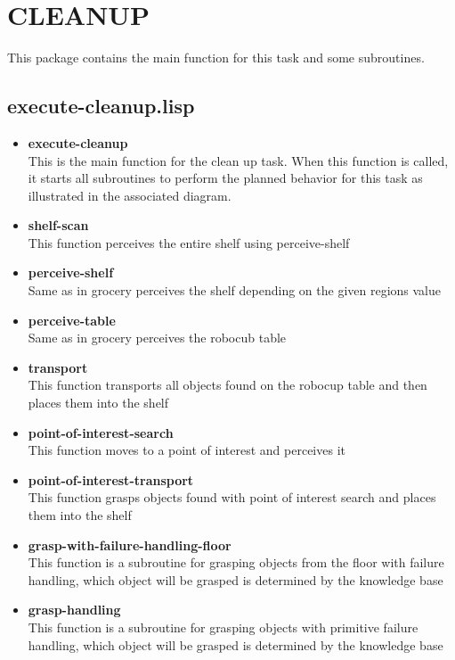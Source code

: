 \documentclass[main.tex]{subfiles}
\begin{document}
	  	\section{CLEANUP}
	  	This package contains the main function for this task and some subroutines.
	  	\subsection{execute-cleanup.lisp}
	  	\begin{itemize}
			\item \textbf{execute-cleanup} \\
			This is the main function for the clean up task. When this function is called, it starts all subroutines to perform the planned behavior for this task as illustrated in the associated diagram.
			\item \textbf{shelf-scan} \\
			This function perceives the entire shelf using perceive-shelf
			\item \textbf{perceive-shelf} \\
			Same as in grocery perceives the shelf depending on the given regions value
			\item \textbf{perceive-table} \\
			Same as in grocery perceives the robocub table
			\item \textbf{transport} \\
            This function transports all objects found on the robocup table and then places them into the shelf
			\item \textbf{point-of-interest-search} \\
			This function moves to a point of interest and perceives it 
			\item \textbf{point-of-interest-transport} \\
			This function grasps objects found with point of interest search and places them into the shelf
			\item \textbf{grasp-with-failure-handling-floor} \\
			This function is a subroutine for grasping objects from the floor with failure handling, which object will be grasped is determined by the knowledge base
			\item \textbf{grasp-handling}\\
			This function is a subroutine for grasping objects with primitive failure handling, which object will be grasped is determined by the knowledge base
		\end{itemize}
\end{document}
